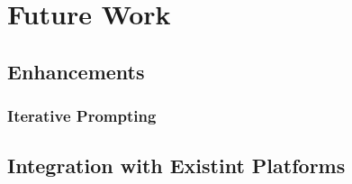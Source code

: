 \chapter{Future Work} \label{chap:chap-6}



\section{Enhancements}

\subsection{Iterative Prompting}

\section{Integration with Existint Platforms}
